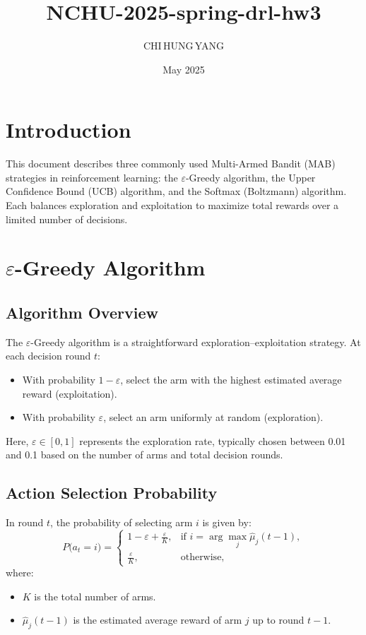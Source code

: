 \documentclass{article}
\title{NCHU-2025-spring-drl-hw3}
\author{CHI\,HUNG\,YANG}
\date{May 2025}
\begin{document}
\maketitle

\section{Introduction}
This document describes three commonly used Multi-Armed Bandit (MAB) strategies in reinforcement learning: the $\varepsilon$-Greedy algorithm, the Upper Confidence Bound (UCB) algorithm, and the Softmax (Boltzmann) algorithm. Each balances exploration and exploitation to maximize total rewards over a limited number of decisions.

\section{$\varepsilon$-Greedy Algorithm}
\subsection{Algorithm Overview}
The $\varepsilon$-Greedy algorithm is a straightforward exploration–exploitation strategy. At each decision round $t$:
\begin{itemize}
  \item With probability $1-\varepsilon$, select the arm with the highest estimated average reward (exploitation).
  \item With probability $\varepsilon$, select an arm uniformly at random (exploration).
\end{itemize}
Here, $\varepsilon\in[0,1]$ represents the exploration rate, typically chosen between 0.01 and 0.1 based on the number of arms and total decision rounds.

\subsection{Action Selection Probability}
In round $t$, the probability of selecting arm $i$ is given by:
\[
P\bigl(a_t = i\bigr) =
\begin{cases}
  1 - \varepsilon + \displaystyle\frac{\varepsilon}{K}, & \text{if } i = \arg\max_{j}\hat\mu_j(t-1), \\
  \displaystyle\frac{\varepsilon}{K},              & \text{otherwise},
\end{cases}
\]
where:
\begin{itemize}
  \item $K$ is the total number of arms.
  \item $\hat\mu_j(t-1)$ is the estimated average reward of arm $j$ up to round $t-1$.
\end{itemize}
\end{document}
